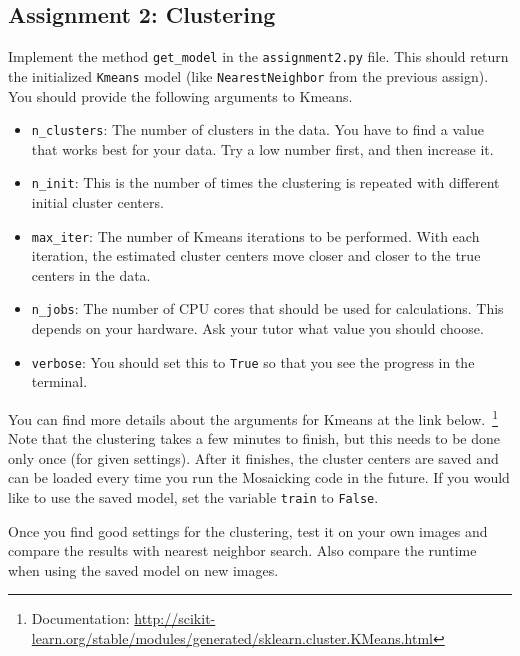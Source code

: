 \documentclass[a4paper]{article}
\begin{document}
	\subsection{Assignment 2: Clustering}
		Implement the method \verb|get_model| in the \verb|assignment2.py| file.
		This should return the initialized \verb|Kmeans| model (like \verb|NearestNeighbor| from the previous assign).
		You should provide the following arguments to Kmeans.
		\begin{itemize}
			\item \verb|n_clusters|: The number of clusters in the data. 
			You have to find a value that works best for your data. 
			Try a low number first, and then increase it.
			\item \verb|n_init|: This is the number of times the clustering is repeated with different initial cluster centers.
			\item \verb|max_iter|: The number of Kmeans iterations to be performed. 
			With each iteration, the estimated cluster centers move closer and closer to the true centers in the data.
			\item \verb|n_jobs|: The number of CPU cores that should be used for calculations. 
			This depends on your hardware. 
			Ask your tutor what value you should choose.
			\item \verb|verbose|: You should set this to \verb|True| so that you see the progress in the terminal.
		\end{itemize}
		You can find more details about the arguments for Kmeans at the link below.~\footnote{
			Documentation: \url{http://scikit-learn.org/stable/modules/generated/sklearn.cluster.KMeans.html}
		}
		Note that the clustering takes a few minutes to finish, but this needs to be done only once (for given settings).
		After it finishes, the cluster centers are saved and can be loaded every time you run the Mosaicking code in the future.
		If you would like to use the saved model, set the variable \verb|train| to \verb|False|.
		
		Once you find good settings for the clustering, test it on your own images and compare the results with nearest neighbor search.
		Also compare the runtime when using the saved model on new images.
		
\end{document}
